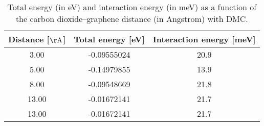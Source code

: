 \begin{table}[h]
\centering
\begin{tabular}{ccc}
\hline
Distance [$\mathrm{\AA}$] & Total energy [eV] & Interaction energy [meV] \\
\hline
3.00 & -0.09555024 & 20.9 \\
5.00 & -0.14979855 & 13.9 \\
8.00 & -0.09548669 & 21.8 \\
13.00 & -0.01672141 & 21.7 \\
13.00 & -0.01672141 & 21.7 \\
\hline
\end{tabular}
\caption{Total energy (in eV) and interaction energy (in meV) as a function of the carbon dioxide--graphene distance (in Angstrom) with DMC.}
\label{SI_dft_table_DMC}
\end{table}